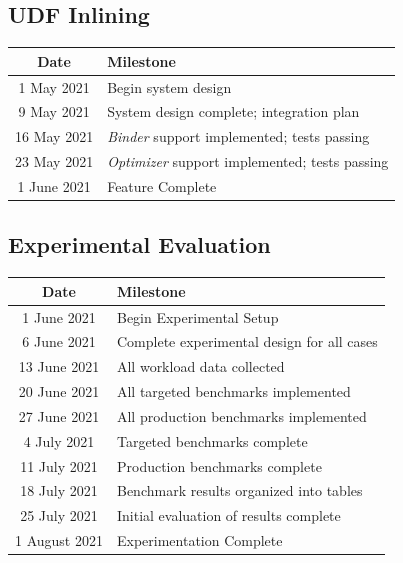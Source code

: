 \documentclass{vldb}
\begin{document}
\subsection{UDF Inlining}

\begin{center}
\begin{tabular}{ |c|l| } 
    \hline
    \textbf{Date} & \textbf{Milestone} \\ 
    \hline
    1 May 2021 & Begin system design \\
    \hline
    9 May 2021 & System design complete; integration plan \\
    \hline
    16 May 2021 & \textit{Binder} support implemented; tests passing \\
    \hline
    23 May 2021 & \textit{Optimizer} support implemented; tests passing \\
    \hline  
    1 June 2021 & Feature Complete \\
    \hline
\end{tabular}
\end{center}

\subsection{Experimental Evaluation}

\begin{center}
\begin{tabular}{ |c|l| } 
    \hline
    \textbf{Date} & \textbf{Milestone} \\ 
    \hline
    1 June 2021 & Begin Experimental Setup \\
    \hline
    6 June 2021 & Complete experimental design for all cases \\
    \hline
    13 June 2021 & All workload data collected \\
    \hline
    20 June 2021 & All targeted benchmarks implemented \\
    \hline
    27 June 2021 & All production benchmarks implemented \\
    \hline
    4 July 2021 & Targeted benchmarks complete \\
    \hline
    11 July 2021 & Production benchmarks complete \\
    \hline
    18 July 2021 & Benchmark results organized into tables \\
    \hline
    25 July 2021 & Initial evaluation of results complete \\
    \hline
    1 August 2021 & Experimentation Complete \\
    \hline
\end{tabular}
\end{center}


\newcommand{\newblock}{}

\newpage


\end{document}
